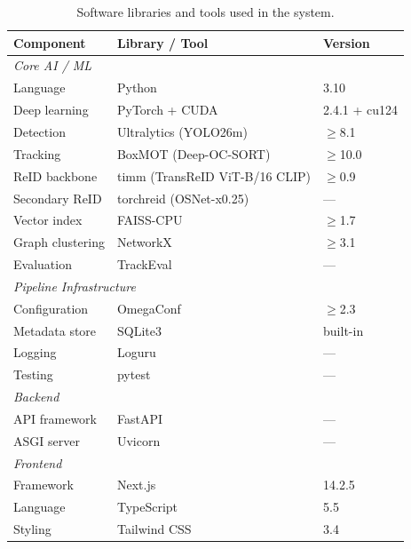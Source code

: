 \begin{table}[htbp]
\centering
\caption{Software libraries and tools used in the system.}
\label{tab:software}
\begin{tabular}{lll}
\hline
\textbf{Component} & \textbf{Library / Tool} & \textbf{Version} \\ \hline
\multicolumn{3}{l}{\textit{Core AI / ML}} \\
Language            & Python                  & 3.10              \\
Deep learning       & PyTorch + CUDA          & 2.4.1 + cu124     \\
Detection           & Ultralytics (YOLO26m)   & $\geq$8.1         \\
Tracking            & BoxMOT (Deep-OC-SORT)   & $\geq$10.0        \\
ReID backbone       & timm (TransReID ViT-B/16 CLIP) & $\geq$0.9   \\
Secondary ReID      & torchreid (OSNet-x0.25) & ---               \\
Vector index        & FAISS-CPU               & $\geq$1.7         \\
Graph clustering    & NetworkX                & $\geq$3.1         \\
Evaluation          & TrackEval               & ---               \\
\multicolumn{3}{l}{\textit{Pipeline Infrastructure}} \\
Configuration       & OmegaConf               & $\geq$2.3         \\
Metadata store      & SQLite3                 & built-in          \\
Logging             & Loguru                  & ---               \\
Testing             & pytest                  & ---               \\
\multicolumn{3}{l}{\textit{Backend}} \\
API framework       & FastAPI                 & ---               \\
ASGI server         & Uvicorn                 & ---               \\
\multicolumn{3}{l}{\textit{Frontend}} \\
Framework           & Next.js                 & 14.2.5            \\
Language            & TypeScript              & 5.5               \\
Styling             & Tailwind CSS            & 3.4               \\

\end{tabular}
\end{table}
